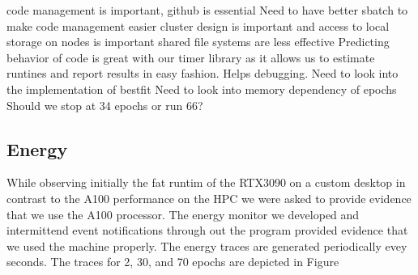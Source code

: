 \documentclass[utf8]{FrontiersinVancouver} %
\newcommand{\TODO}[1]{\todo[inline]{#1}}
\begin{document}
code management is important, github is essential
Need to have better sbatch to make code management easier
cluster design is important and access to local storage on nodes is important
shared file systems are less effective 
Predicting behavior of code is great with our timer library as it allows us to estimate runtines and report results in easy fashion. Helps debugging.
Need to look into the implementation of bestfit 
Need to look into memory dependency of epochs
Should we stop at 34 epochs or run 66?

\TODO{add k80 elsewhere}



\subsection{Energy}
\label{sec:perf-energy}


While observing initially the fat runtim of the RTX3090 on a custom
desktop in contrast to the A100 performance on the HPC we were asked
to provide evidence that we use the A100 processor. The energy monitor
we developed and intermittend event notifications through out the
program provided evidence that we used the machine properly. The
energy traces are generated periodically evey seconds. The traces for
2, 30, and 70 epochs are depicted in Figure
\end{document}

